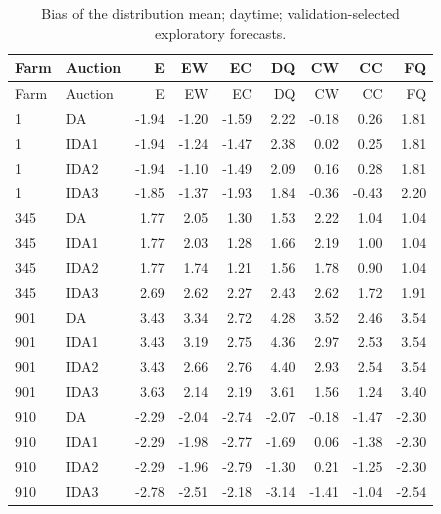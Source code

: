 \documentclass[11pt,a4paper]{article}
\begin{document}
\begin{longtable}{llrrrrrrr}
\caption{Bias of the distribution mean; daytime; validation-selected exploratory forecasts.}\\
\toprule Farm & Auction & E & EW & EC & DQ & CW & CC & FQ \\
\midrule\endfirsthead
\toprule Farm & Auction & E & EW & EC & DQ & CW & CC & FQ \\
\midrule\endhead
1 & DA & -1.94 & -1.20 & -1.59 & 2.22 & -0.18 & 0.26 & 1.81 \\
1 & IDA1 & -1.94 & -1.24 & -1.47 & 2.38 & 0.02 & 0.25 & 1.81 \\
1 & IDA2 & -1.94 & -1.10 & -1.49 & 2.09 & 0.16 & 0.28 & 1.81 \\
1 & IDA3 & -1.85 & -1.37 & -1.93 & 1.84 & -0.36 & -0.43 & 2.20 \\
\midrule
345 & DA & 1.77 & 2.05 & 1.30 & 1.53 & 2.22 & 1.04 & 1.04 \\
345 & IDA1 & 1.77 & 2.03 & 1.28 & 1.66 & 2.19 & 1.00 & 1.04 \\
345 & IDA2 & 1.77 & 1.74 & 1.21 & 1.56 & 1.78 & 0.90 & 1.04 \\
345 & IDA3 & 2.69 & 2.62 & 2.27 & 2.43 & 2.62 & 1.72 & 1.91 \\
\midrule
901 & DA & 3.43 & 3.34 & 2.72 & 4.28 & 3.52 & 2.46 & 3.54 \\
901 & IDA1 & 3.43 & 3.19 & 2.75 & 4.36 & 2.97 & 2.53 & 3.54 \\
901 & IDA2 & 3.43 & 2.66 & 2.76 & 4.40 & 2.93 & 2.54 & 3.54 \\
901 & IDA3 & 3.63 & 2.14 & 2.19 & 3.61 & 1.56 & 1.24 & 3.40 \\
\midrule
910 & DA & -2.29 & -2.04 & -2.74 & -2.07 & -0.18 & -1.47 & -2.30 \\
910 & IDA1 & -2.29 & -1.98 & -2.77 & -1.69 & 0.06 & -1.38 & -2.30 \\
910 & IDA2 & -2.29 & -1.96 & -2.79 & -1.30 & 0.21 & -1.25 & -2.30 \\
910 & IDA3 & -2.78 & -2.51 & -2.18 & -3.14 & -1.41 & -1.04 & -2.54 \\
\midrule
\bottomrule\end{longtable}
\normalsize
\small
\end{document}
